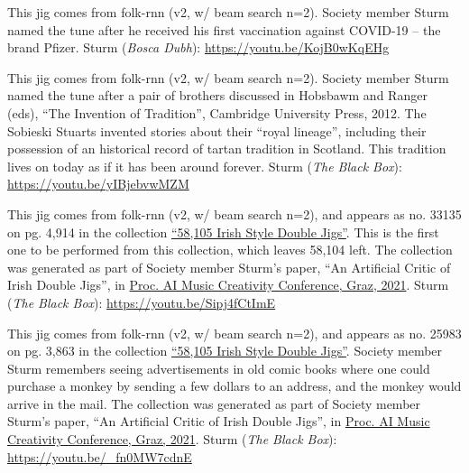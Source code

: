 \documentclass[a4paper,notitlepage,twoside]{book}
\begin{document}
{}  
\hypertarget{jig:PfirstDoseofPfizer}{}
This jig comes from folk-rnn (v2, w/ beam search n=2). 
Society member Sturm named the tune after he received
his first vaccination against COVID-19 -- the brand Pfizer.
Sturm ({\em Bosca Dubh}): \url{https://youtu.be/KojB0wKqEHg}

{}  
\hypertarget{jig:SobieskiStuarts}{}
This jig comes from folk-rnn (v2, w/ beam search n=2). 
Society member Sturm named the tune after a pair of brothers
discussed in Hobsbawm and Ranger (eds), ``The Invention of Tradition'', Cambridge University Press, 2012.
The Sobieski Stuarts invented stories about their ``royal lineage'',
including their possession of an historical record of tartan tradition in Scotland.
This tradition lives on today as if it has been around forever.
Sturm ({\em The Black Box}): \url{https://youtu.be/yIBjebvwMZM}

{}  
\hypertarget{jig:58104togo}{}
This jig comes from folk-rnn (v2, w/ beam search n=2),
and appears as no. 33135 on pg. 4,914 in the collection
\href{http://urn.kb.se/resolve?urn=urn:nbn:se:kth:diva-296578}{``58,105 Irish Style Double Jigs''}.
This is the first one to be performed from this collection,
which leaves 58,104 left.
The collection was generated as part of Society member Sturm's paper,
``An Artificial Critic of Irish Double Jigs'', in \href{https://aimc2021.iem.at/program/papers/}{Proc. AI Music Creativity Conference, Graz, 2021}.
Sturm ({\em The Black Box}): \url{https://youtu.be/Sipj4fCtImE}

{}  
\hypertarget{jig:MonkeyMail}{}
This jig comes from folk-rnn (v2, w/ beam search n=2),
and appears as no. 25983 on pg. 3,863 in the collection
\href{http://urn.kb.se/resolve?urn=urn:nbn:se:kth:diva-296578}{``58,105 Irish Style Double Jigs''}.
Society member Sturm remembers seeing advertisements in old comic books
where one could purchase a monkey by sending a few dollars to an address,
and the monkey would arrive in the mail.
The collection was generated as part of Society member Sturm's paper,
``An Artificial Critic of Irish Double Jigs'', in \href{https://aimc2021.iem.at/program/papers/}{Proc. AI Music Creativity Conference, Graz, 2021}.
Sturm ({\em The Black Box}): \url{https://youtu.be/_fn0MW7cdnE}
\end{document}
